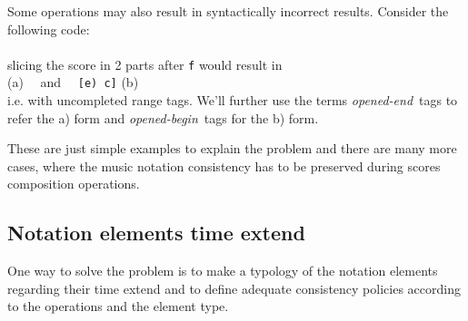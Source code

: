 \documentclass[twoside,10pt,a4paper]{article}
\newcommand{\code}[1]	{{\small \texttt{#1}}}
\newcommand{\gtag}[1]	{$\backslash$\code{#1}}
\newcommand{\oend}		{\emph{opened-end}}
\newcommand{\obeg}		{\emph{opened-begin}}
\newcommand{\codeindent}	{\\ \hspace*{9mm}}
\begin{document}
Some operations may also result in syntactically incorrect results. Consider the following code:
\codeindent \code{[g \gtag{slur}(f e) c]} \\
slicing the score in 2 parts after \code{f} would result in 
\codeindent \code{[g \gtag{slur}(f]} (a) \ \  and \ \  \code{[e) c]} (b) \\
i.e. with uncompleted range tags. We'll further use the terms \oend\ tags to refer the a) form and \obeg\ tags for the b) form.

These are just simple examples to explain the problem and there are many more cases, where the music notation consistency has to be preserved during scores composition operations.

\subsection{Notation elements time extend}
One way to solve the problem is to make a typology of the notation elements regarding their time extend and to define adequate consistency policies according to the operations and the element type.
\end{document}
